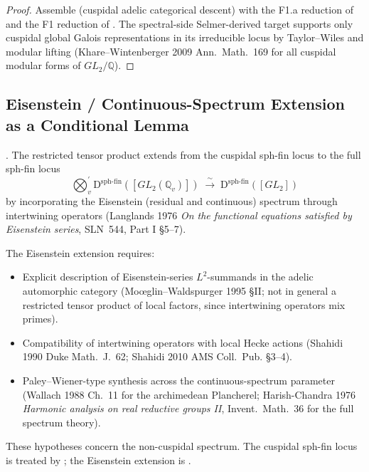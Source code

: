 \begin{proof}
Assemble  (cuspidal adelic
categorical descent) with the F1.a reduction of
 and the F1 reduction of
. The spectral-side Selmer-derived
target supports only cuspidal global Galois representations in its
irreducible locus by Taylor--Wiles and modular lifting
(Khare--Wintenberger 2009 Ann.~Math.~169 for all cuspidal modular
forms of \(GL_{2}/\mathbb{Q}\)).
\end{proof}

\subsection{Eisenstein / Continuous-Spectrum Extension as a Conditional Lemma}

\begin{conjecture}
\label{v4-arith:w5-e:conj:LACD-Eisenstein}
\ClaimStatusConjectured. The restricted tensor product extends from
the cuspidal sph-fin locus to the full sph-fin locus
\[
\bigotimes_{v}^{\prime}\mathrm{D}^{\mathrm{sph\text{-}fin}}([GL_{2}(\mathbb{Q}_{v})])
\;\xrightarrow{\;\sim\;}\;
\mathrm{D}^{\mathrm{sph\text{-}fin}}([GL_{2}])
\]
by incorporating the Eisenstein (residual and continuous) spectrum
through intertwining operators
(Langlands 1976 \emph{On the functional equations satisfied by
Eisenstein series}, SLN~544, Part I \S 5--7).
\end{conjecture}

\begin{remark}
\label{v4-arith:w5-e:rem:LACD-Eisenstein-domain}
The Eisenstein extension requires:
\begin{itemize}
\item Explicit description of Eisenstein-series \(L^{2}\)-summands in
the adelic automorphic category (Mo{\oe}glin--Waldspurger 1995 \S II;
not in general a restricted tensor product of local factors, since
intertwining operators mix primes).
\item Compatibility of intertwining operators with local Hecke
actions (Shahidi 1990 Duke Math.~J.~62; Shahidi 2010 AMS Coll.~Pub.
\S 3--4).
\item Paley--Wiener-type synthesis across the continuous-spectrum
parameter (Wallach 1988 Ch.~11 for the archimedean Plancherel;
Harish-Chandra 1976 \emph{Harmonic analysis on real reductive
groups II}, Invent.~Math.~36 for the full spectrum theory).
\end{itemize}
These hypotheses concern the non-cuspidal spectrum. The cuspidal
sph-fin locus is treated by ;
the Eisenstein extension is .
\end{remark}

